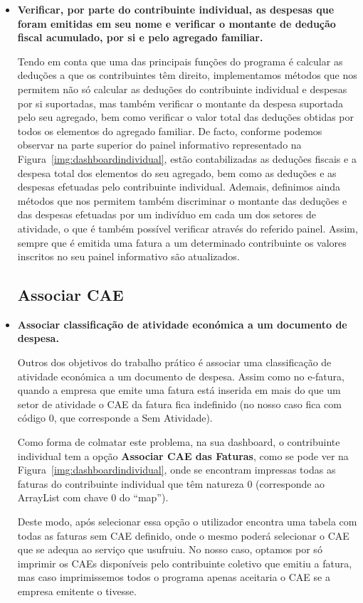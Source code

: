 \documentclass[a4paper]{article}
\begin{document}
\begin{itemize}
\item \textbf{Verificar, por parte do contribuinte individual, as despesas que foram emitidas
em seu nome e verificar o montante de dedução fiscal acumulado, por si e pelo agregado familiar.}

Tendo em conta que uma das principais funções do programa é calcular as
deduções a que os contribuintes têm direito, implementamos métodos que nos permitem
não só calcular as deduções do contribuinte individual e despesas por si suportadas, mas
também verificar o montante da despesa suportada pelo seu agregado, bem como verificar
o valor total das deduções obtidas por todos os elementos do agregado
familiar.
De facto, conforme podemos observar na parte superior do painel informativo
representado na Figura~\ref{img:dashboardindividual}, estão contabilizadas as deduções
fiscais e a despesa total dos elementos do seu agregado, bem como as deduções e as
despesas efetuadas pelo contribuinte individual.
Ademais, definimos ainda métodos que nos permitem também discriminar o montante
das deduções e das despesas efetuadas por um indivíduo em cada um dos setores de atividade,
o que é também possível verificar através do referido painel.
Assim, sempre que é emitida uma fatura a um determinado contribuinte os valores inscritos
no seu painel informativo são atualizados.



\subsection{Associar CAE}
\label{sec:associarcae}

\item \textbf{Associar classificação de atividade económica a um documento de despesa.}

Outros dos objetivos do trabalho prático é associar uma classificação de atividade
económica a um documento de despesa. Assim como no e-fatura, quando a empresa que emite
uma fatura está inserida em mais do que um setor de atividade o CAE da fatura fica
indefinido (no nosso caso fica com código 0, que corresponde a Sem Atividade).

Como forma de colmatar este problema, na sua dashboard, o contribuinte individual
tem a opção \textbf{Associar CAE das Faturas}, como se pode ver na
Figura~\ref{img:dashboardindividual}, onde se encontram impressas todas as faturas
do contribuinte individual que têm natureza 0 (corresponde ao ArrayList
com chave 0 do ``map'').

Deste modo, após selecionar essa opção o utilizador encontra uma tabela com todas
as faturas sem CAE definido, onde o mesmo poderá selecionar o CAE que se adequa
ao serviço que usufruiu. No nosso caso, optamos por só imprimir os CAEs disponíveis
pelo contribuinte coletivo que emitiu a fatura, mas caso imprimissemos todos
o programa apenas aceitaria o CAE se a empresa emitente o tivesse.


\end{itemize}
\end{document}
